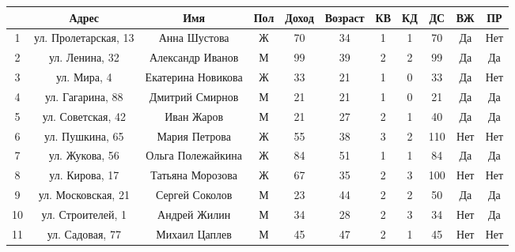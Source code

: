 \begin{table}[]
\small
\begin{tabular}{|c|c|c|c|c|c|c|c|c|c|c|}

\hline
   & Адрес     & Имя             & Пол & Доход & Возраст & КВ & КД & ДС & ВЖ & ПР \\ \hline
1  & ул. Пролетарская, 13 & Анна Шустова       & Ж      & 70       & 34         & 1                   & 1                & 70          & Да              & Нет                   \\ \hline
2  & ул. Ленина, 32       & Александр Иванов   & М      & 99       & 39         & 2                   & 2                & 99          & Да              & Да                    \\ \hline
3  & ул. Мира, 4          & Екатерина Новикова & Ж      & 33       & 21         & 1                   & 0                & 33          & Да              & Нет                   \\ \hline
4  & ул. Гагарина, 88     & Дмитрий Смирнов    & М      & 21       & 21         & 1                   & 0                & 21          & Да              & Да                    \\ \hline
5  & ул. Советская, 42    & Иван Жаров        & М      & 21       & 27         & 2                   & 1                & 40          & Да              & Да                    \\ \hline
6  & ул. Пушкина, 65      & Мария Петрова      & Ж      & 55       & 38         & 3                   & 2                & 110         & Нет             & Нет                   \\ \hline
7  & ул. Жукова, 56       & Ольга Полежайкина     & Ж      & 84       & 51         & 1                   & 1                & 84          & Да              & Да                    \\ \hline
8  & ул. Кирова, 17       & Татьяна Морозова   & Ж      & 67       & 35         & 2                   & 3                & 100         & Нет             & Нет                   \\ \hline
9  & ул. Московская, 21   & Сергей Соколов     & М      & 23       & 44         & 2                   & 2                & 50          & Да              & Да                    \\ \hline
10 & ул. Строителей, 1    & Андрей Жилин     & М      & 34       & 28         & 2                   & 3                & 34          & Нет             & Да                    \\ \hline
11 & ул. Садовая, 77      & Михаил Цаплев      & М      & 45       & 47         & 2                   & 1                & 45          & Нет             & Нет                   \\ \hline

\end{tabular}
\end{table}
